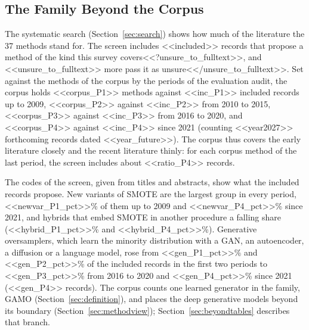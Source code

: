 \subsection{The Family Beyond the Corpus}
\label{sec:beyond}

The systematic search (Section~\ref{sec:search}) shows how much of the literature the 37 methods stand for. The screen includes <<included>> records that propose a method of the kind this survey covers<<?unsure_to_fulltext>>, and <<unsure_to_fulltext>> more pass it as unsure<</unsure_to_fulltext>>. Set against the methods of the corpus by the periods of the evaluation audit, the corpus holds <<corpus_P1>> methods against <<inc_P1>> included records up to 2009, <<corpus_P2>> against <<inc_P2>> from 2010 to 2015, <<corpus_P3>> against <<inc_P3>> from 2016 to 2020, and <<corpus_P4>> against <<inc_P4>> since 2021 (counting <<year2027>> forthcoming records dated <<year_future>>). The corpus thus covers the early literature closely and the recent literature thinly: for each corpus method of the last period, the screen includes about <<ratio_P4>> records.

The codes of the screen, given from titles and abstracts, show what the included records propose. New variants of SMOTE are the largest group in every period, <<newvar_P1_pct>>\% of them up to 2009 and <<newvar_P4_pct>>\% since 2021, and hybrids that embed SMOTE in another procedure a falling share (<<hybrid_P1_pct>>\% and <<hybrid_P4_pct>>\%). Generative oversamplers, which learn the minority distribution with a GAN, an autoencoder, a diffusion or a language model, rose from <<gen_P1_pct>>\% and <<gen_P2_pct>>\% of the included records in the first two periods to <<gen_P3_pct>>\% from 2016 to 2020 and <<gen_P4_pct>>\% since 2021 (<<gen_P4>> records). The corpus counts one learned generator in the family, GAMO (Section~\ref{sec:definition}), and places the deep generative models beyond its boundary (Section~\ref{sec:methodview}); Section~\ref{sec:beyondtables} describes that branch.

